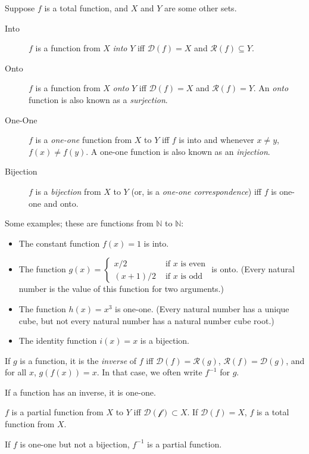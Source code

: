 Suppose $f$ is a total function, and $X$ and $Y$ are some other sets. \begin{definition}
\begin{description}
	\item [Into] $f$ is a function from $X$ \emph{into} $Y$ iff $\mathcal{D}(f) = X$ and $\mathcal{R}(f)\subseteq Y$.
	\item [Onto] $f$ is a function from $X$ \emph{onto} $Y$ iff $\mathcal{D}(f) = X$ and $\mathcal{R}(f) = Y$. An \emph{onto} function is also known as a \emph{surjection}.
	\item [One-One] $f$ is a \emph{one-one} function from $X$ to $Y$ iff $f$ is into and whenever $x\neq y$, $f(x)\neq f(y)$. A one-one function is also known as an \emph{injection}.
	\item [Bijection] $f$ is a \emph{bijection} from $X$ to $Y$ (or, is a \emph{one-one correspondence}) iff $f$ is one-one and onto.
\end{description}
\end{definition}
Some examples; these are functions from $\mathbb{N}$ to $\mathbb{N}$: \begin{itemize}
	\item The constant function $f(x) = 1$ is into.
	\item The function $g(x) = \begin{cases}
		x/2 &\text{ if $x$ is even}\\ (x+1)/2 &\text{ if $x$ is odd} \end{cases}$ is onto. (Every natural number is the value of this function for two arguments.)
	\item The function $h(x)=x^3$ is one-one. (Every natural number has a unique cube, but not every natural number has a natural number cube root.)
 	\item The identity function $i(x) = x$ is a bijection.
\end{itemize}

\begin{definition}[Inverse] If $g$ is a function, it is the \emph{inverse} of $f$ iff  $\mathcal{D}(f)=\mathcal{R}(g)$, $\mathcal{R}(f)=\mathcal{D}(g)$, and for all $x$, $g(f(x))=x$. In that case, we often write $f^{-1}$ for $g$.
 \end{definition} 
\begin{theorem}
	If a function has an inverse, it is one-one.
\end{theorem}
\begin{definition}
 $f$ is a partial function from $X$ to $Y$ iff $\mathcal{D(f)} \subset X$. If $\mathcal{D}(f)=X$, $f$ is a total function from $X$.
\end{definition}
\begin{theorem}
	If $f$ is one-one but not a bijection, $f^{-1}$ is a partial function.
\end{theorem}


